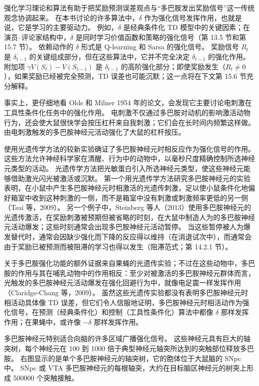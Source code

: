 \documentclass[UTF8,12pt,a4paper,fontset=fandol]{ctexart}
\begin{document}
强化学习理论和算法有助于把奖励预测误差观点与“多巴胺发出奖励信号”这一传统观念协调起来。
在本书讨论的许多算法中，$\delta$ 作为强化信号发挥作用，也就是说，它是学习的主要驱动力。
例如，$\delta$ 是经典条件化 TD 模型中的关键因素；在演员--评论家结构中，$\delta$ 是同时学习价值函数和策略的强化信号（第 13.5 节和第 15.7 节）。
依赖动作的 $\delta$ 形式是 Q-learning 和 Sarsa 的强化信号。
奖励信号 $R_t$ 是 $\delta_{t-1}$ 的关键组成部分，但在这些算法中，它并不完全决定 $\delta_{t-1}$ 的强化作用。
附加项 $\gamma V(S_t)-V(S_{t-1})$ 是 $\delta_{t-1}$ 的高阶强化部分；即使奖励发生（$R_t\neq 0$），如果奖励已经被完全预测，TD 误差也可能沉默；这一点将在下文第 15.6 节充分解释。

事实上，更仔细地看 Olds 和 Milner 1954 年的论文，会发现它主要讨论电刺激在工具性条件化任务中的强化作用。
电刺激不仅通过多巴胺对动机的影响激活动物行为，还会使大鼠很快学会按压杠杆来自我刺激；它们会在长时间内频繁这样做。
由电刺激触发的多巴胺神经元活动强化了大鼠的杠杆按压。

使用光遗传学方法的较新实验确证了多巴胺神经元时相反应作为强化信号的作用。
这些方法允许神经科学家在清醒、行为中的动物中，以毫秒尺度精确控制所选神经元类型的活动。
光遗传学方法把光敏蛋白引入所选神经元类型，使这些神经元能够借助激光闪光被激活或沉默。
第一个用光遗传学方法研究多巴胺神经元的实验表明，在小鼠中产生多巴胺神经元时相激活的光遗传刺激，足以使小鼠条件化地偏好箱室中收到这种刺激的一侧，而不是箱室中没有刺激或刺激频率更低的另一侧（Tsai 等，2009）。
另一个例子中，Steinberg 等人（2013）使用多巴胺神经元的光遗传激活，在奖励刺激被预期但被省略的时刻，在大鼠中制造人为的多巴胺神经元活动爆发；这些时刻通常会出现多巴胺神经元活动暂停。
当这些暂停被人为爆发替代时，通常会因缺少强化而下降的反应得以维持（在消退试次中），而通常会由于奖励已被预测而被阻滞的学习也得以发生（阻滞范式；第 14.2.1 节）。

关于多巴胺强化功能的额外证据来自果蝇的光遗传实验；不过在这些动物中，多巴胺的作用与其在哺乳动物中的作用相反：至少对被激活的多巴胺神经元群体而言，光触发的多巴胺神经元活动爆发在强化回避行为中，就像电足震一样发挥作用（Claridge-Chang 等，2009）。
虽然这些光遗传实验都没有表明多巴胺神经元时相活动具体像 TD 误差，但它们令人信服地证明，多巴胺神经元时相活动作为强化信号，在预测（经典条件化）和控制（工具性条件化）算法中都像 $\delta$ 那样发挥作用；在果蝇中，或许像 $-\delta$ 那样发挥作用。

多巴胺神经元特别适合向脑的许多区域广播强化信号。
这些神经元具有巨大的轴突树，每个神经元在 100 到 1000 倍于典型神经元轴突所达到的突触部位释放多巴胺。
右图显示的是单个多巴胺神经元的轴突树，它的胞体位于大鼠脑的 SNpc 中。
SNpc 或 VTA 多巴胺神经元的每根轴突，大约在目标脑区神经元的树突上形成 500000 个突触接触。
\end{document}
